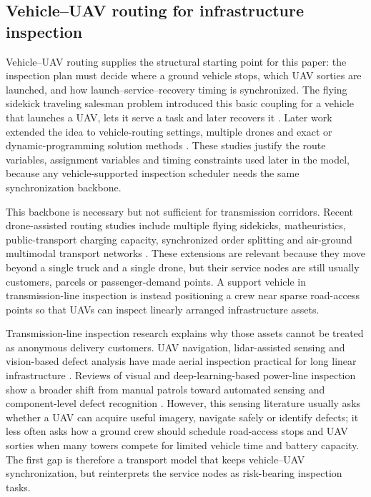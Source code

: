 \subsection{Vehicle--UAV routing for infrastructure inspection}

Vehicle--UAV routing supplies the structural starting point for this paper: the inspection plan must decide where a ground vehicle stops, which UAV sorties are launched, and how launch--service--recovery timing is synchronized. The flying sidekick traveling salesman problem introduced this basic coupling for a vehicle that launches a UAV, lets it serve a task and later recovers it \citep{murray2015flying}. Later work extended the idea to vehicle-routing settings, multiple drones and exact or dynamic-programming solution methods \citep{agatz2018tspdrone,wang2019vrpd,roberti2021exact}. These studies justify the route variables, assignment variables and timing constraints used later in the model, because any vehicle-supported inspection scheduler needs the same synchronization backbone.

This backbone is necessary but not sufficient for transmission corridors. Recent drone-assisted routing studies include multiple flying sidekicks, matheuristics, public-transport charging capacity, synchronized order splitting and air-ground multimodal transport networks \citep{murray2020multiple,schermer2019matheuristic,yang2025integrated,zhang2026airground}. These extensions are relevant because they move beyond a single truck and a single drone, but their service nodes are still usually customers, parcels or passenger-demand points. A support vehicle in transmission-line inspection is instead positioning a crew near sparse road-access points so that UAVs can inspect linearly arranged infrastructure assets.

Transmission-line inspection research explains why those assets cannot be treated as anonymous delivery customers. UAV navigation, lidar-assisted sensing and vision-based defect analysis have made aerial inspection practical for long linear infrastructure \citep{hui2019monocular,liu2021uavlidar,li2021uavtransmission}. Reviews of visual and deep-learning-based power-line inspection show a broader shift from manual patrols toward automated sensing and component-level defect recognition \citep{nguyen2018visionreview,zhang2020visualinspection,li2025deeppowerline}. However, this sensing literature usually asks whether a UAV can acquire useful imagery, navigate safely or identify defects; it less often asks how a ground crew should schedule road-access stops and UAV sorties when many towers compete for limited vehicle time and battery capacity. The first gap is therefore a transport model that keeps vehicle--UAV synchronization, but reinterprets the service nodes as risk-bearing inspection tasks.

